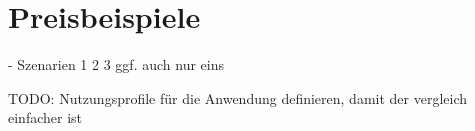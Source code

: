 \section{Preisbeispiele}

- Szenarien 1 2 3 ggf. auch nur eins

TODO: Nutzungsprofile für die Anwendung definieren, damit der vergleich einfacher ist